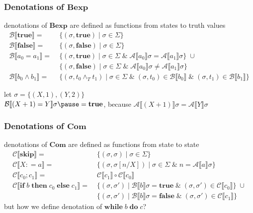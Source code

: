 \documentclass[12pt,aspectratio=169]{beamer}
\newcommand{\Bexp}{\mathbf{Bexp}}
\newcommand{\Com}{\mathbf{Com}}
\newcommand{\denoA}[1]{\mathcal{A} \llbracket #1 \rrbracket}
\newcommand{\denoB}[1]{\mathcal{B} \llbracket #1 \rrbracket}
\newcommand{\denoC}[1]{\mathcal{C} \llbracket #1 \rrbracket}
\newcommand{\true}{\mathbf{true}}
\newcommand{\false}{\mathbf{false}}
\newcommand{\Skip}{\mathbf{skip}}
\def\coloneqq{\mathrel{\mathop:}=}
\newcommand{\Assign}[2]{#1 \coloneqq #2}
\newcommand{\ITE}[3]{\mathbf{if}\; #1 \; \mathbf{then} \; #2 \; \mathbf{else} \; #3}
\newcommand{\While}[2]{\mathbf{while}\; #1 \; \mathbf{do} \; #2}
\begin{document}
\begin{frame}
    \frametitle{Denotations of $\Bexp$}
    denotations of $\Bexp$ are defined as functions from states to truth values
        \begin{align*}
            \denoB{\true} = & \; \{(\sigma, \true) \mid \sigma \in \Sigma\} \\
            \denoB{\false} = & \; \{ (\sigma,\false) \mid \sigma \in \Sigma\} \\
            \denoB{a_0 = a_1} = & \;
            \{ (\sigma, \true) \mid \sigma \in \Sigma \; \& \; \denoA{a_0}\sigma = \denoA{a_1}\sigma\} \; \cup\\
            & \; \{ (\sigma, \false) \mid \sigma \in \Sigma \; \& \; \denoA{a_0}\sigma \neq \denoA{a_1}\sigma\}\\
            \denoB{b_0 \land b_1} = & \; \{(\sigma, t_0 \land_T t_1) \mid \sigma \in \Sigma \; \& \; (\sigma,t_0) \in \denoB{b_0} \; \& \; (\sigma,t_1) \in \denoB{b_1} \}
        \end{align*}
        \vspace{-10mm}
        \pause
    \begin{example}
        let $\sigma = \{(X,1),(Y,2)\}$\\ \pause
        $\denoB{(X + 1) = Y}\sigma \pause = \true$, \pause because $\denoA{(X+1)}\sigma = \denoA{Y}\sigma$ 
    \end{example}
\end{frame}

\begin{frame}
    \frametitle{Denotations of $\Com$}
    denotations of $\Com$ are defined as functions from state to state
    \begin{align*}
        \denoC{\Skip} =& \;\{(\sigma,\sigma) \mid \sigma \in \Sigma\}\\
        \denoC{\Assign{X}{a}} =& \;\{(\sigma,\sigma[n/X]) \mid \sigma \in \Sigma \; \& \; n = \denoA{a}\sigma\}\\
        \denoC{c_0;c_1} =& \;\denoC{c_1} \circ \denoC{c_0}\\
        \denoC{\ITE{b}{c_0}{c_1}} =& \;
            \{(\sigma,\sigma') \mid \denoB{b}\sigma = \true \; \& \; (\sigma, \sigma') \in \denoC{c_0}\} \; \cup\\
            & \;\{(\sigma,\sigma') \mid \denoB{b}\sigma = \false \; \& \; (\sigma, \sigma') \in \denoC{c_1}\}
    \end{align*}
    \pause
    but how we define denotation of $\While{b}{c}$?
\end{frame}
\end{document}
